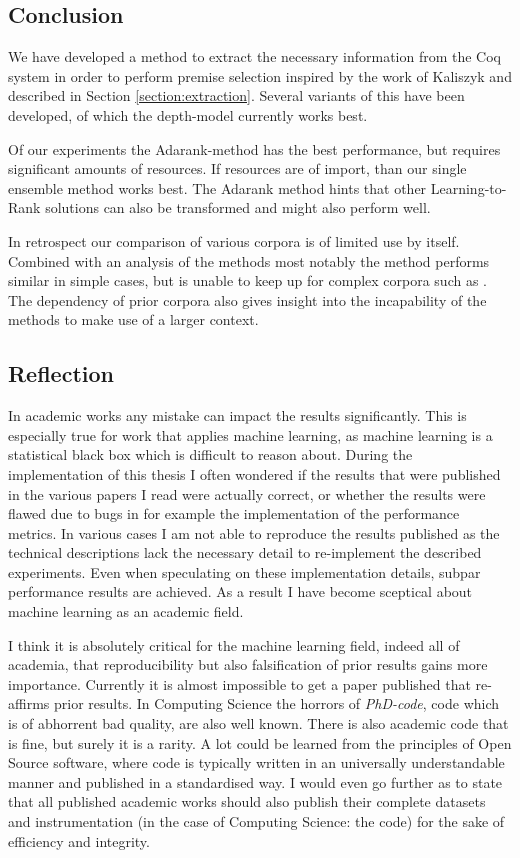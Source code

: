 \subsection{Conclusion}
We have developed a method to extract the necessary information from the Coq system in order to perform premise selection
inspired by the work of Kaliszyk and described in Section \ref{section:extraction}.
Several variants of this have been developed, of which the depth-model currently works best.

Of our experiments the Adarank-method has the best performance, but requires significant amounts of resources.
If resources are of import, than our single ensemble method works best.
The Adarank method hints that other Learning-to-Rank solutions can also be transformed and might also perform well.

In retrospect our comparison of various corpora is of limited use by itself.
Combined with an analysis of the methods most notably the \knnadaptive method performs similar in simple cases,
but is unable to keep up for complex corpora such as \corn.
The dependency of prior corpora also gives insight into the incapability of the methods to make use
of a larger context.

\subsection{Reflection}
In academic works any mistake can impact the results significantly.
This is especially true for work that applies machine learning, as machine learning is a statistical black box which
is difficult to reason about.
During the implementation of this thesis I often wondered if the results that were published in the various papers I read
were actually correct, or whether the results were flawed due to bugs in for example the implementation of the
performance metrics.
In various cases I am not able to reproduce the results published as the technical descriptions lack the necessary detail
to re-implement the described experiments.
Even when speculating on these implementation details, subpar performance results are achieved.
As a result I have become sceptical about machine learning as an academic field.

I think it is absolutely critical for the machine learning field, indeed all of academia,
that reproducibility but also falsification of prior results gains more importance.
Currently it is almost impossible to get a paper published that re-affirms prior results.
In Computing Science the horrors of \emph{PhD-code}, code which is of abhorrent bad quality, are also well known.
There is also academic code that is fine, but surely it is a rarity.
A lot could be learned from the principles of Open Source software, where code is typically written
in an universally understandable manner and published in a standardised way.
I would even go further as to state that all published academic works should also publish
their complete datasets and instrumentation (in the case of Computing Science: the code)
for the sake of efficiency and integrity.

